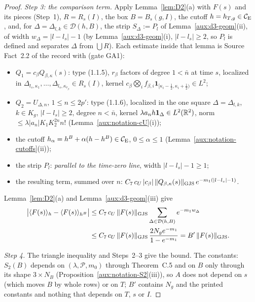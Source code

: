 \begin{proof}
\emph{Step 3: the comparison term.}  Apply Lemma~\ref{lem:D2}(a) with $F(s)$ and its pieces
(Step~1), $R=R_s(I)$, the box $B=B_s(g,I)$, the cutoff $h=h_{T,g}\in\mathcal{C}_{\mathrm E}$, and, for
$\Delta=\Delta_{l,k}\in\mathcal D(h,B)$, the strip $S_\Delta:=P_l$ of
Lemma~\ref{aux:d3-geom}(ii), of width $w_\Delta=|l-l_s|-1$ (by Lemma~\ref{aux:d3-geom}(i),
$|l-l_s|\ge2$, so $P_l$ is defined and separates $\Delta$ from $\bigcup R$).  Each estimate inside
that lemma is Source Fact~2.2 of the record with (gate GA1):
\begin{itemize}
\item $Q_1=c_\beta Q_{\beta,\kappa}(s)$: type (1.1.5), $r_\beta$ factors of degree $1<\bar n$ at
  time $s$, localized in $\Delta_{l_s,\kappa_1},\dots,\Delta_{l_s,\kappa_{r_\beta}}\in R_s(I)$,
  kernel $c_\beta\bigotimes_if_{\beta,i}\mathbf 1_{[\kappa_i-\frac12,\kappa_i+\frac12)}\in L^2$;
\item $Q_2=U_{\Delta,n}$, $1\le n\le2p'$: type (1.1.6), localized in the one square
  $\Delta=\Delta_{l,k}$, $k\in K_g$, $|l-l_s|\ge2$, degree $n<\bar n$, kernel
  $\lambda a_nh\mathbf 1_\Delta\in L^2(\mathbb{R}^2)$, norm $\le\lambda|a_n|K_1K_2^{2n}n!$
  (Lemma~\ref{aux:notation-cU}(i));
\item the cutoff $h_\alpha=h^B+\alpha(h-h^B)\in\mathcal{C}_{\mathrm E}$, $0\le\alpha\le1$
  (Lemma~\ref{aux:notation-cutoffs}(ii));
\item the strip $P_l$: \emph{parallel to the time-zero line}, width $|l-l_s|-1\ge1$;
\item the resulting term, summed over $n$: $C_7\,c_U\,|c_\beta|\,\lVert Q_{\beta,\kappa}(s)\rVert_{\mathrm{GJS}}\,
  e^{-m_1(|l-l_s|-1)}$.
\end{itemize}
Lemma~\ref{lem:D2}(a) and Lemma~\ref{aux:d3-geom}(iii) give
\begin{align*}
 \bigl|\langle F(s)\rangle_{h}-\langle F(s)\rangle_{h^B}\bigr|
 &\le C_7\,c_U\,\lVert F(s)\rVert_{\mathrm{GJS}}\sum_{\Delta\in\mathcal D(h,B)}e^{-m_1w_\Delta}\\
 &\le C_7\,c_U\,\lVert F(s)\rVert_{\mathrm{GJS}}\,\frac{2N_ge^{-m_1}}{1-e^{-m_1}}=B'\,\lVert F(s)\rVert_{\mathrm{GJS}} .
\end{align*}

\emph{Step 4.}  The triangle inequality and Steps~2--3 give the bound.  The constants: $S_2(B)$
depends on $(\lambda,\mathscr P,m_0)$ through Theorem~C.5 and on $B$ only through its shape
$3\times N_B$ (Proposition~\ref{aux:notation-S2}(iii)), so $A$ does not depend on $s$ (which moves
$B$ by whole rows) or on $T$; $B'$ contains $N_g$ and the printed constants and nothing that
depends on $T$, $s$ or $I$.
\end{proof}

